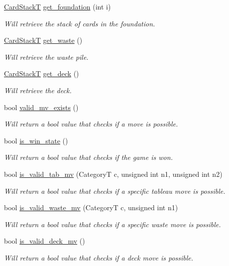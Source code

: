 \begin{DoxyCompactItemize}
\hyperlink{class_stack}{Card\+StackT} \hyperlink{class_board_t_ac61569f97fe32c08aeecc0583170282c}{get\+\_\+foundation} (int i)
\begin{DoxyCompactList}\small\item\em Will retrieve the stack of cards in the foundation. \end{DoxyCompactList}\item 
\hyperlink{class_stack}{Card\+StackT} \hyperlink{class_board_t_a1e3a7edd2e993d22a453da1487177585}{get\+\_\+waste} ()
\begin{DoxyCompactList}\small\item\em Will retrieve the waste pile. \end{DoxyCompactList}\item 
\hyperlink{class_stack}{Card\+StackT} \hyperlink{class_board_t_a2f28e0a5e9c34f396e2aebc79342a225}{get\+\_\+deck} ()
\begin{DoxyCompactList}\small\item\em Will retrieve the deck. \end{DoxyCompactList}\item 
bool \hyperlink{class_board_t_a9420e96ccd6692d0e63054277c5ef672}{valid\+\_\+mv\+\_\+exists} ()
\begin{DoxyCompactList}\small\item\em Will return a bool value that checks if a move is possible. \end{DoxyCompactList}\item 
bool \hyperlink{class_board_t_a163bed593a3f0ba24dd5401b595b75cd}{is\+\_\+win\+\_\+state} ()
\begin{DoxyCompactList}\small\item\em Will return a bool value that checks if the game is won. \end{DoxyCompactList}\item 
bool \hyperlink{class_board_t_afe6861b6e3ddeeaa1387e92ba71200eb}{is\+\_\+valid\+\_\+tab\+\_\+mv} (CategoryT c, unsigned int n1, unsigned int n2)
\begin{DoxyCompactList}\small\item\em Will return a bool value that checks if a specific tableau move is possible. \end{DoxyCompactList}\item 
bool \hyperlink{class_board_t_ab448ae18fcc213db945c358e4f99585f}{is\+\_\+valid\+\_\+waste\+\_\+mv} (CategoryT c, unsigned int n1)
\begin{DoxyCompactList}\small\item\em Will return a bool value that checks if a specific waste move is possible. \end{DoxyCompactList}\item 
bool \hyperlink{class_board_t_affe6cfc5c246bcfa0afd59476c70db8c}{is\+\_\+valid\+\_\+deck\+\_\+mv} ()
\begin{DoxyCompactList}\small\item\em Will return a bool value that checks if a deck move is possible. \end{DoxyCompactList}\end{DoxyCompactItemize}



